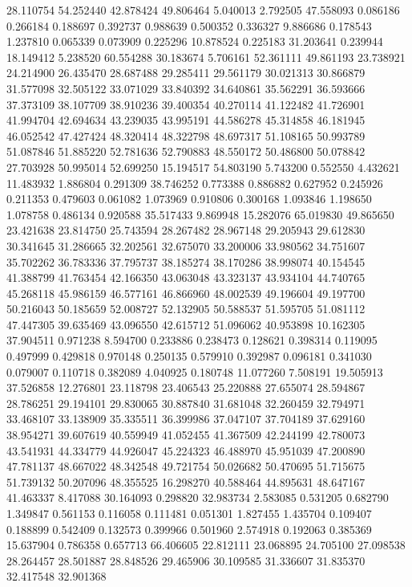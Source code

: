 28.110754
54.252440
42.878424
49.806464
5.040013
2.792505
47.558093
0.086186
0.266184
0.188697
0.392737
0.988639
0.500352
0.336327
9.886686
0.178543
1.237810
0.065339
0.073909
0.225296
10.878524
0.225183
31.203641
0.239944
18.149412
5.238520
60.554288
30.183674
5.706161
52.361111
49.861193
23.738921
24.214900
26.435470
28.687488
29.285411
29.561179
30.021313
30.866879
31.577098
32.505122
33.071029
33.840392
34.640861
35.562291
36.593666
37.373109
38.107709
38.910236
39.400354
40.270114
41.122482
41.726901
41.994704
42.694634
43.239035
43.995191
44.586278
45.314858
46.181945
46.052542
47.427424
48.320414
48.322798
48.697317
51.108165
50.993789
51.087846
51.885220
52.781636
52.790883
48.550172
50.486800
50.078842
27.703928
50.995014
52.699250
15.194517
54.803190
5.743200
0.552550
4.432621
11.483932
1.886804
0.291309
38.746252
0.773388
0.886882
0.627952
0.245926
0.211353
0.479603
0.061082
1.073969
0.910806
0.300168
1.093846
1.198650
1.078758
0.486134
0.920588
35.517433
9.869948
15.282076
65.019830
49.865650
23.421638
23.814750
25.743594
28.267482
28.967148
29.205943
29.612830
30.341645
31.286665
32.202561
32.675070
33.200006
33.980562
34.751607
35.702262
36.783336
37.795737
38.185274
38.170286
38.998074
40.154545
41.388799
41.763454
42.166350
43.063048
43.323137
43.934104
44.740765
45.268118
45.986159
46.577161
46.866960
48.002539
49.196604
49.197700
50.216043
50.185659
52.008727
52.132905
50.588537
51.595705
51.081112
47.447305
39.635469
43.096550
42.615712
51.096062
40.953898
10.162305
37.904511
0.971238
8.594700
0.233886
0.238473
0.128621
0.398314
0.119095
0.497999
0.429818
0.970148
0.250135
0.579910
0.392987
0.096181
0.341030
0.079007
0.110718
0.382089
4.040925
0.180748
11.077260
7.508191
19.505913
37.526858
12.276801
23.118798
23.406543
25.220888
27.655074
28.594867
28.786251
29.194101
29.830065
30.887840
31.681048
32.260459
32.794971
33.468107
33.138909
35.335511
36.399986
37.047107
37.704189
37.629160
38.954271
39.607619
40.559949
41.052455
41.367509
42.244199
42.780073
43.541931
44.334779
44.926047
45.224323
46.488970
45.951039
47.200890
47.781137
48.667022
48.342548
49.721754
50.026682
50.470695
51.715675
51.739132
50.207096
48.355525
16.298270
40.588464
44.895631
48.647167
41.463337
8.417088
30.164093
0.298820
32.983734
2.583085
0.531205
0.682790
1.349847
0.561153
0.116058
0.111481
0.051301
1.827455
1.435704
0.109407
0.188899
0.542409
0.132573
0.399966
0.501960
2.574918
0.192063
0.385369
15.637904
0.786358
0.657713
66.406605
22.812111
23.068895
24.705100
27.098538
28.264457
28.501887
28.848526
29.465906
30.109585
31.336607
31.835370
32.417548
32.901368
